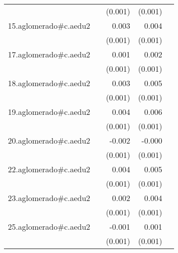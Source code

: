 {\begin{longtable}{l*{4}{D{.}{.}{-1}}}
            &                     &     (0.001)         &     (0.001)         &                     \\
\addlinespace
15.aglomerado#c.aedu2&                     &       0.003\sym{*}  &       0.004\sym{***}&                     \\
            &                     &     (0.001)         &     (0.001)         &                     \\
\addlinespace
17.aglomerado#c.aedu2&                     &       0.001         &       0.002\sym{*}  &                     \\
            &                     &     (0.001)         &     (0.001)         &                     \\
\addlinespace
18.aglomerado#c.aedu2&                     &       0.003\sym{*}  &       0.005\sym{***}&                     \\
            &                     &     (0.001)         &     (0.001)         &                     \\
\addlinespace
19.aglomerado#c.aedu2&                     &       0.004\sym{**} &       0.006\sym{***}&                     \\
            &                     &     (0.001)         &     (0.001)         &                     \\
\addlinespace
20.aglomerado#c.aedu2&                     &      -0.002         &      -0.000         &                     \\
            &                     &     (0.001)         &     (0.001)         &                     \\
\addlinespace
22.aglomerado#c.aedu2&                     &       0.004\sym{**} &       0.005\sym{***}&                     \\
            &                     &     (0.001)         &     (0.001)         &                     \\
\addlinespace
23.aglomerado#c.aedu2&                     &       0.002         &       0.004\sym{***}&                     \\
            &                     &     (0.001)         &     (0.001)         &                     \\
\addlinespace
25.aglomerado#c.aedu2&                     &      -0.001         &       0.001         &                     \\
            &                     &     (0.001)         &     (0.001)         &                     \\

\end{longtable}}
